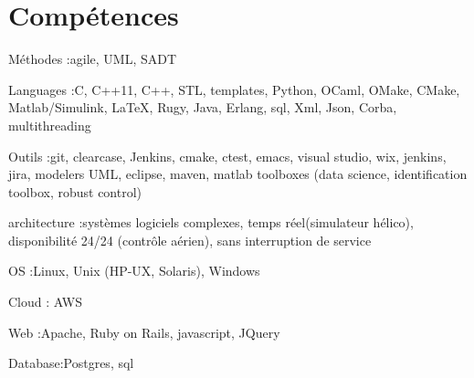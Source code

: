 \section{Compétences}

\begin{itemize}

\myitem
{Méthodes :}{agile, UML, SADT}

\myitem
{Languages :}{C, C++11, C++, STL, templates, Python, OCaml, OMake, CMake, Matlab/Simulink, LaTeX, Rugy, Java, Erlang, sql, Xml, Json, Corba, multithreading}

\myitem
{Outils :}{git, clearcase, Jenkins, cmake, ctest, emacs, visual studio, wix, jenkins, jira, modelers UML, eclipse, maven, matlab toolboxes (data science, identification toolbox, robust control)}

\myitem
{architecture :}{systèmes logiciels complexes, temps réel(simulateur hélico), disponibilité 24/24 (contrôle aérien), sans interruption de service}

\myitem
{OS :}{Linux, Unix (HP-UX, Solaris), Windows}

\myitem
{Cloud} : {AWS}

\myitem 
{Web :}{Apache, Ruby on Rails, javascript, JQuery}

\myitem 
{Database:}{Postgres, sql}

\end{itemize}
